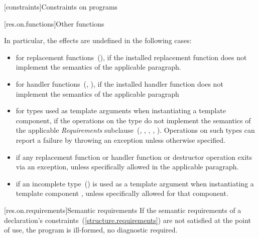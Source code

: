 \setcounter{subsection}{3}
[constraints]{Constraints on programs}

\setcounter{subsubsection}{7}
[res.on.functions]{Other functions}

\setcounter{Paras}{1}
\pnum
In particular, the effects are undefined in the following cases:

\begin{itemize}
\item
for replacement functions~(), if the installed replacement function does not
implement the semantics of the applicable
\required
paragraph.
\item
for handler functions~(, ),
if the installed handler function does not implement the semantics of the applicable
\required
paragraph
\item
for types used as template arguments when instantiating a template component,
if the operations on the type do not implement the semantics of the applicable
\emph{Requirements}
subclause~(, , ,
, ).
Operations on such types can report a failure by throwing an exception
unless otherwise specified.
\item
if any replacement function or handler function or destructor operation exits via an exception,
unless specifically allowed
in the applicable
\required
paragraph.
\item
if an incomplete type~() is used as a template
argument when instantiating a template component , unless specifically
allowed for that component.
\end{itemize}

\begin{addedblock}
\setcounter{subsubsection}{11}
[res.on.requirements]{Semantic requirements}
\pnum
If the semantic requirements of a declaration's
constraints~(\ref{structure.requirements}) are not satisfied at the point of
use, the program is ill-formed, no diagnostic required.
\end{addedblock}
